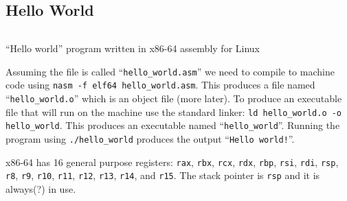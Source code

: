 \begin{center}
\end{center}

\subsection{Hello World}

\begin{listing}[H]
  \inputminted[frame=lines]{asm}{code/hello_world.asm}
  \caption{``Hello world'' program written in x86-64 assembly for Linux}
  \label{lst:hello-world-asm}
\end{listing}

Assuming the file is called ``\texttt{hello_world.asm}'' we need to
compile to machine code using \texttt{nasm -f elf64
  hello_world.asm}. This produces a file named
``\texttt{hello_world.o}'' which is an object file (more later). To
produce an executable file that will run on the machine use the standard linker:
\texttt{ld hello_world.o -o hello_world}. This produces an
executable named ``\texttt{hello_world}''. Running the program
using \texttt{./hello_world} produces the output
``\texttt{Hello world!}''.

x86-64 has 16 general purpose registers: \texttt{rax},
\texttt{rbx}, \texttt{rcx}, \texttt{rdx},
\texttt{rbp}, \texttt{rsi}, \texttt{rdi},
\texttt{rsp}, \texttt{r8}, \texttt{r9},
\texttt{r10}, \texttt{r11}, \texttt{r12},
\texttt{r13}, \texttt{r14}, and \texttt{r15}. The
stack pointer is \texttt{rsp} and it is always(?) in use.

